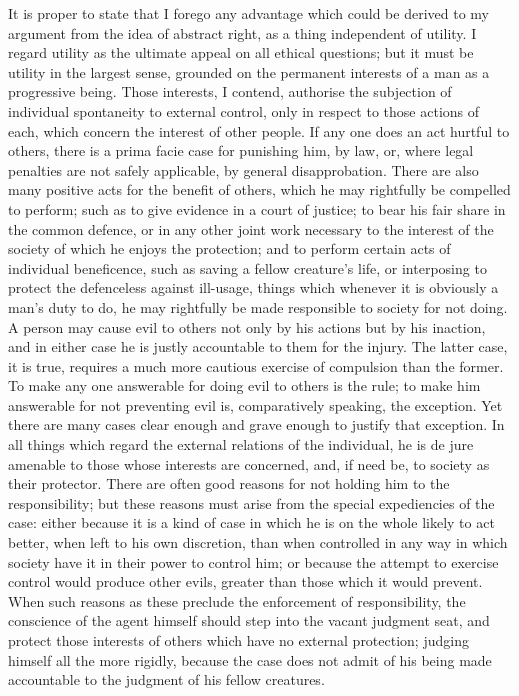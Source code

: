\documentclass[11pt,openany]{book}
\begin{document}
It is proper to state that I forego any advantage which could be derived to my argument from the idea of abstract right, as a thing independent of utility. I regard utility as the ultimate appeal on all ethical questions; but it must be utility in the largest sense, grounded on the permanent interests of a man as a progressive being. Those interests, I contend, authorise the subjection of individual spontaneity to external control, only in respect to those actions of each, which concern the interest of other people. If any one does an act hurtful to others, there is a prima facie case for punishing him, by law, or, where legal penalties are not safely applicable, by general disapprobation. There are also many positive acts for the benefit of others, which he may rightfully be compelled to perform; such as to give evidence in a court of justice; to bear his fair share in the common defence, or in any other joint work necessary to the interest of the society of which he enjoys the protection; and to perform certain acts of individual beneficence, such as saving a fellow creature's life, or interposing to protect the defenceless against ill-usage, things which whenever it is obviously a man's duty to do, he may rightfully be made responsible to society for not doing. A person may cause evil to others not only by his actions but by his inaction, and in either case he is justly accountable to them for the injury. The latter case, it is true, requires a much more cautious exercise of compulsion than the former. To make any one answerable for doing evil to others is the rule; to make him answerable for not preventing evil is, comparatively speaking, the exception. Yet there are many cases clear enough and grave enough to justify that exception. In all things which regard the external relations of the individual, he is de jure amenable to those whose interests are concerned, and, if need be, to society as their protector. There are often good reasons for not holding him to the responsibility; but these reasons must arise from the special expediencies of the case: either because it is a kind of case in which he is on the whole likely to act better, when left to his own discretion, than when controlled in any way in which society have it in their power to control him; or because the attempt to exercise control would produce other evils, greater than those which it would prevent. When such reasons as these preclude the enforcement of responsibility, the conscience of the agent himself should step into the vacant judgment seat, and protect those interests of others which have no external protection; judging himself all the more rigidly, because the case does not admit of his being made accountable to the judgment of his fellow creatures.
\end{document}
